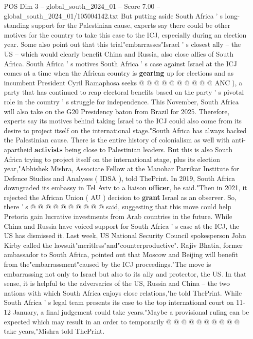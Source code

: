 \begin{textsample}{POS Dim 3 – global\_south\_2024\_01 – Score 7.00 – global\_south\_2024\_01/105004142.txt}
But putting aside South Africa ' s long-standing support for the Palestinian cause, experts say there could be other motives for the country to take this case to the ICJ, especially during an election year.
Some also point out that this trial"embarrasses"Israel ' s closest ally -- the US -- which would clearly benefit China and Russia, also close allies of South Africa.
South Africa ' s motives South Africa ' s case against Israel at the ICJ comes at a time when the African country is \textbf{gearing} up for elections and as incumbent President Cyril Ramaphosa seeks @ @ @ @ @ @ @ @ @ @ ANC ), a party that has continued to reap electoral benefits based on the party ' s pivotal role in the country ' s struggle for independence.
This November, South Africa will also take on the G20 Presidency baton from Brazil for 2025.
Therefore, experts say its motives behind taking Israel to the ICJ could also come from its desire to project itself on the international stage."South Africa has always backed the Palestinian cause.
There is the entire history of colonialism as well with anti-apartheid \textbf{activists} being close to Palestinian leaders.
But this is also South Africa trying to project itself on the international stage, plus its election year,"Abhishek Mishra, Associate Fellow at the Manohar Parrikar Institute for Defence Studies and Analyses ( IDSA ), told ThePrint.
In 2019, South Africa downgraded its embassy in Tel Aviv to a liaison \textbf{officer}, he said."Then in 2021, it rejected the African Union ( AU ) decision to \textbf{grant} Israel as an observer.
So, there ' s @ @ @ @ @ @ @ @ @ @ said, suggesting that this move could help Pretoria gain lucrative investments from Arab countries in the future.
While China and Russia have voiced support for South Africa ' s case at the ICJ, the US has dismissed it.
Last week, US National Security Council spokesperson John Kirby called the lawsuit"meritless"and"counterproductive".
Rajiv Bhatia, former ambassador to South Africa, pointed out that Moscow and Beijing will benefit from the"embarrassment"caused by the ICJ proceedings."The move is embarrassing not only to Israel but also to its ally and protector, the US.
In that sense, it is helpful to the adversaries of the US, Russia and China -- the two nations with which South Africa enjoys close relations,"he told ThePrint.
While South Africa ' s legal team presents its case to the top international court on 11-12 January, a final judgement could take years."Maybe a provisional ruling can be expected which may result in an order to temporarily @ @ @ @ @ @ @ @ @ @ take years,"Mishra told ThePrint.

\end{textsample}
